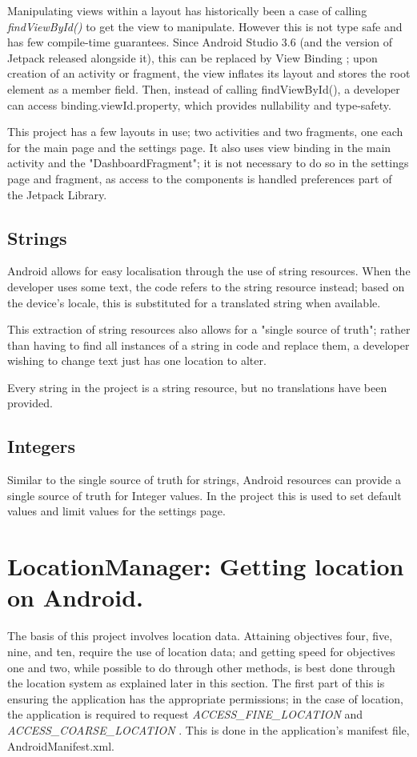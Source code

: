 \documentclass[11pt, a4paper, notitlepage]{report}
\begin{document}
Manipulating views within a layout has historically been a case of calling \textit{findViewById()} to get the view to manipulate. However this is not type safe and has few compile-time guarantees. Since Android Studio 3.6 (and the version of Jetpack released alongside it), this can be replaced by View Binding \citep{viewBindingAndroid}; upon creation of an activity or fragment, the view inflates its layout and stores the root element as a member field. Then, instead of calling findViewById(), a developer can access binding.viewId.property, which provides nullability and type-safety.

This project has a few layouts in use; two activities and two fragments, one each for the main page and the settings page. It also uses view binding in the main activity and the "DashboardFragment"; it is not necessary to do so in the settings page and fragment, as access to the components is handled preferences part of the Jetpack Library.

\subsection{Strings}
Android allows for easy localisation through the use of string resources. When the developer uses some text, the code refers to the string resource instead; based on the device's locale, this is substituted for a translated string when available.

This extraction of string resources also allows for a "single source of truth"; rather than having to find all instances of a string in code and replace them, a developer wishing to change text just has one location to alter.

Every string in the project is a string resource, but no translations have been provided.

\subsection{Integers}
Similar to the single source of truth for strings, Android resources can provide a single source of truth for Integer values. In the project this is used to set default values and limit values for the settings page.

\section{LocationManager: Getting location on Android.}
The basis of this project involves location data. Attaining objectives four, five, nine, and ten, require the use of location data; and getting speed for objectives one and two, while possible to do through other methods, is best done through the location system as explained later in this section. The first part of this is ensuring the application has the appropriate permissions; in the case of location, the application is required to request \textit{ACCESS\_FINE\_LOCATION} and \textit{ACCESS\_COARSE\_LOCATION} \citep{permissionsAndroid}. This is done in the application's manifest file, AndroidManifest.xml.
\end{document}
